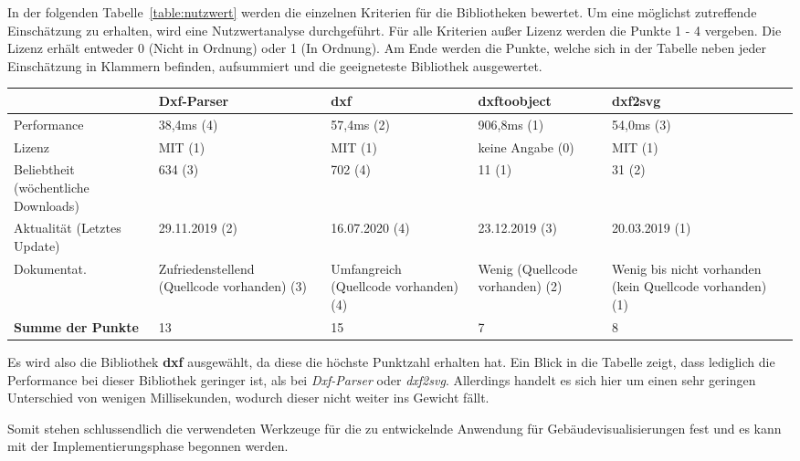 In der folgenden Tabelle~\ref{table:nutzwert} werden die einzelnen Kriterien für die Bibliotheken bewertet.
Um eine möglichst zutreffende Einschätzung zu erhalten, wird eine Nutzwertanalyse durchgeführt.
Für alle Kriterien außer Lizenz werden die Punkte 1 - 4 vergeben.
Die Lizenz erhält entweder 0 (Nicht in Ordnung) oder 1 (In Ordnung).
Am Ende werden die Punkte, welche sich in der Tabelle neben jeder Einschätzung in Klammern befinden, aufsummiert und die geeigneteste Bibliothek ausgewertet.

\begin{center}
    \scriptsize
    \begin{supertabular}{ p{1.4cm}|p{1.6cm}|p{1.5cm}|p{1.3cm}|p{1.3cm} }
        \label{table:nutzwert}
        & \textbf{Dxf-Parser} & \textbf{dxf} & \textbf{dxftoobject} & \textbf{dxf2svg} \\
        \hline
        Performance & 38,4ms (4) & 57,4ms (2) & 906,8ms (1) & 54,0ms (3) \\
        Lizenz & MIT (1) & MIT (1) & keine Angabe (0) & MIT (1) \\
        Beliebtheit (wöchentliche Downloads) & 634 (3) & 702 (4) & 11 (1) & 31 (2) \\
        Aktualität (Letztes Update) & 29.11.2019 (2) & 16.07.2020 (4) & 23.12.2019 (3) & 20.03.2019 (1) \\
        Dokumentat. & Zufriedenstellend (Quellcode vorhanden) (3) & Umfangreich (Quellcode vorhanden) (4) & Wenig (Quellcode vorhanden) (2) & Wenig bis nicht vorhanden (kein Quellcode vorhanden) (1) \\
        \hline
        \textbf{Summe der Punkte} & 13 & 15 & 7 & 8 \\
    \end{supertabular}
\end{center}

Es wird also die Bibliothek \textbf{dxf} ausgewählt, da diese die höchste Punktzahl erhalten hat.
Ein Blick in die Tabelle zeigt, dass lediglich die Performance bei dieser Bibliothek geringer ist, als bei \textit{Dxf-Parser} oder \textit{dxf2svg}.
Allerdings handelt es sich hier um einen sehr geringen Unterschied von wenigen Millisekunden, wodurch dieser nicht weiter ins Gewicht fällt.

Somit stehen schlussendlich die verwendeten Werkzeuge für die zu entwickelnde Anwendung für Gebäudevisualisierungen fest und es kann mit der Implementierungsphase begonnen werden.

